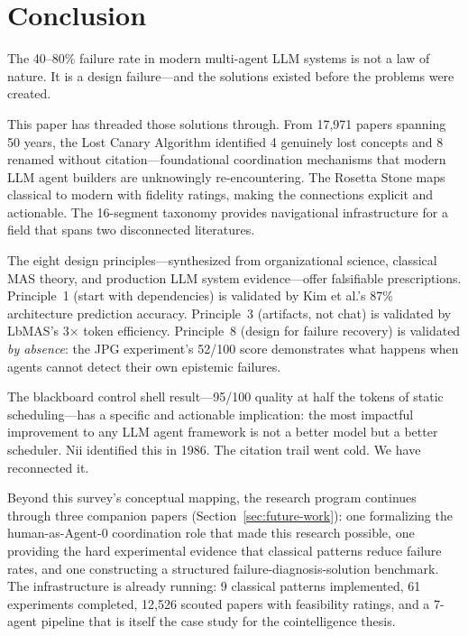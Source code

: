\documentclass{article}
\begin{document}
\section{Conclusion}
\label{sec:conclusion}

The 40--80\% failure rate in modern multi-agent LLM systems is not a law of nature.
It is a design failure---and the solutions existed before the problems were created.

This paper has threaded those solutions through. From 17,971 papers spanning 50 years,
the Lost Canary Algorithm identified 4 genuinely lost concepts and 8 renamed without
citation---foundational coordination mechanisms that modern LLM agent builders are
unknowingly re-encountering. The Rosetta Stone maps classical to modern with fidelity
ratings, making the connections explicit and actionable. The 16-segment taxonomy
provides navigational infrastructure for a field that spans two disconnected
literatures.

The eight design principles---synthesized from organizational science, classical MAS
theory, and production LLM system evidence---offer falsifiable prescriptions.
Principle~1 (start with dependencies) is validated by Kim et al.'s 87\% architecture
prediction accuracy. Principle~3 (artifacts, not chat) is validated by LbMAS's
3$\times$ token efficiency. Principle~8 (design for failure recovery) is validated
\emph{by absence}: the JPG experiment's 52/100 score demonstrates what happens when
agents cannot detect their own epistemic failures.

The blackboard control shell result---95/100 quality at half the tokens of static
scheduling---has a specific and actionable implication: the most impactful improvement
to any LLM agent framework is not a better model but a better scheduler. Nii identified
this in 1986. The citation trail went cold. We have reconnected it.

Beyond this survey's conceptual mapping, the research program continues through
three companion papers (Section~\ref{sec:future-work}): one formalizing the
human-as-Agent-0 coordination role that made this research possible, one providing
the hard experimental evidence that classical patterns reduce failure rates, and one
constructing a structured failure-diagnosis-solution benchmark. The infrastructure
is already running: 9 classical patterns implemented, 61 experiments completed,
12,526 scouted papers with feasibility ratings, and a 7-agent pipeline that is
itself the case study for the cointelligence thesis.
\end{document}
